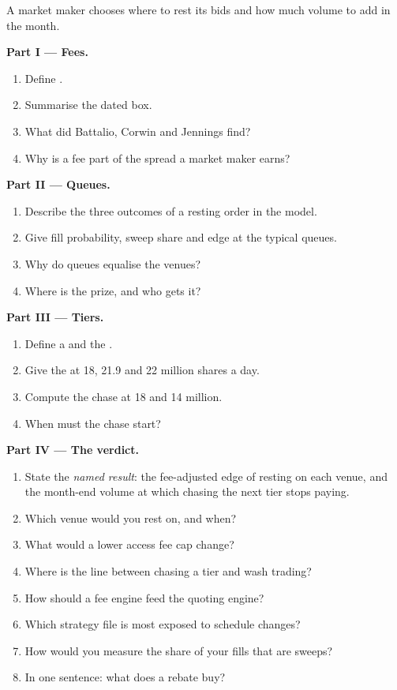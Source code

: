 \begin{problem}\label{pb:hf:rebates-inverted-venues-and-tiers:1}
A market maker chooses where to rest its bids and how much volume to add in the month.

\medskip\noindent\textbf{Part I --- Fees.}
\begin{enumerate}
\item Define .
\item Summarise the dated box.
\item What did Battalio, Corwin and Jennings find?
\item Why is a fee part of the spread a market maker earns?
\end{enumerate}

\medskip\noindent\textbf{Part II --- Queues.}
\begin{enumerate}[resume]
\item Describe the three outcomes of a resting order in the model.
\item Give fill probability, sweep share and edge at the typical queues.
\item Why do queues equalise the venues?
\item Where is the prize, and who gets it?
\end{enumerate}

\medskip\noindent\textbf{Part III --- Tiers.}
\begin{enumerate}[resume]
\item Define a  and the .
\item Give the  at 18, 21.9 and 22 million shares a day.
\item Compute the chase at 18 and 14 million.
\item When must the chase start?
\end{enumerate}

\medskip\noindent\textbf{Part IV --- The verdict.}
\begin{enumerate}[resume]
\item State the \emph{named result}: the fee-adjusted edge of resting on each venue, and the month-end volume at which chasing the next tier stops
paying.
\item Which venue would you rest on, and when?
\item What would a lower access fee cap change?
\item Where is the line between chasing a tier and wash trading?
\item How should a fee engine feed the quoting engine?
\item Which strategy file is most exposed to schedule changes?
\item How would you measure the share of your fills that are sweeps?
\item In one sentence: what does a rebate buy?
\end{enumerate}
\end{problem}

